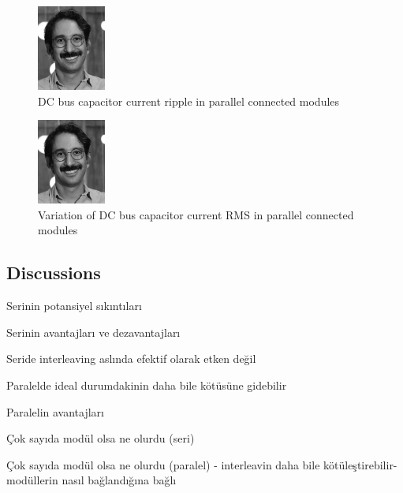 \begin{figure}[h]
    \centering
    \includegraphics[width=0.2\textwidth]{figures/parallel_curr_ripple.jpg}
    \caption{DC bus capacitor current ripple in parallel connected modules}
    \label{fig:parallel_curr_ripple}
\end{figure}

\begin{figure}[h]
    \centering
    \includegraphics[width=0.2\textwidth]{figures/parallel_curr_rms.jpg}
    \caption{Variation of DC bus capacitor current RMS in parallel connected modules}
    \label{fig:parallel_curr_rms}
\end{figure}

\subsection{Discussions}

Serinin potansiyel sıkıntıları

Serinin avantajları ve dezavantajları

Seride interleaving aslında efektif olarak etken değil

Paralelde ideal durumdakinin daha bile kötüsüne gidebilir

Paralelin avantajları

Çok sayıda modül olsa ne olurdu (seri)

Çok sayıda modül olsa ne olurdu (paralel) - interleavin daha bile kötüleştirebilir- modüllerin nasıl bağlandığına bağlı
